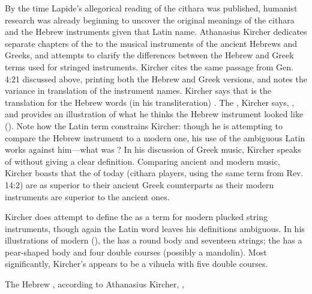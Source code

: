 By the time Lapide's allegorical reading of the cithara was published, humanist
research was already beginning to uncover the original meanings of the cithara
and the Hebrew instruments given that Latin name.
Athanasius Kircher dedicates separate chapters of the  to the
musical instruments of the ancient Hebrews and Greeks, and attempts to clarify
the differences between the Hebrew and Greek terms used for stringed
instruments.
Kircher cites the same passage from Gen. 4:21 discussed above, printing both
the Hebrew and Greek versions, and notes the variance in translation of the
instrument names.
Kircher says that  is the translation for the Hebrew words (in
his transliteration) .
The , Kircher says, , and provides an illustration of what he thinks
the Hebrew instrument looked like ().%
    \autocite[, 44--49]{Kircher:Musurgia} 
Note how the Latin term constrains Kircher: though he is attempting to compare
the Hebrew instrument to a modern one, his use of the ambiguous Latin
 works against him---what was ?
In his discussion of Greek music, Kircher speaks of  without
giving a clear definition.
Comparing ancient and modern music, Kircher boasts that the
 of today (cithara players, using the same term from Rev.
14:2) are as superior to their ancient Greek counterparts as their modern
instruments are superior to the ancient ones.
    \Autocite[, 548]{Kircher:Musurgia}


Kircher does attempt to define the  as a term for modern
plucked string instruments, though again the Latin word leaves his definitions
ambiguous.
In his illustrations of modern 
(), the  has a round body and
seventeen strings; the  has a pear-shaped
body and four double courses (possibly a mandolin).
Most significantly, Kircher's  appears to be a vihuela
with five double courses.

{The Hebrew , according to Athanasius Kircher, , }


